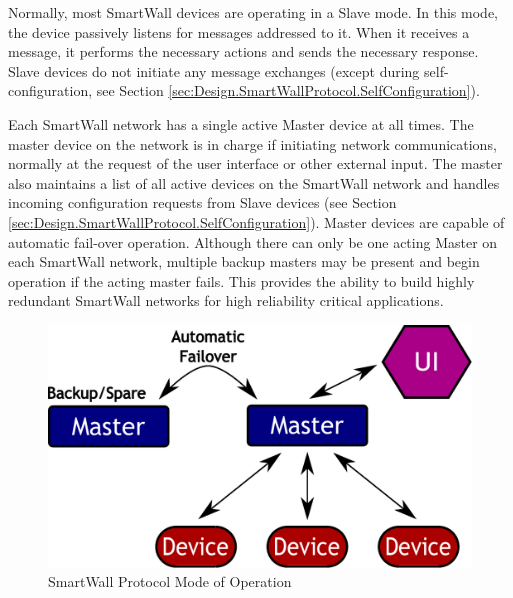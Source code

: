 \documentclass[12pt]{article}
\begin{document}
Normally, most SmartWall devices are operating in a
Slave mode. In this mode, the device passively listens for messages
addressed to it. When it receives a message, it performs the necessary
actions and sends the necessary response. Slave devices do not initiate
any message exchanges (except during self-configuration, see Section
\ref{sec:Design.SmartWallProtocol.SelfConfiguration}).

Each SmartWall network has a single active Master device at all
times. The master device on the network is in charge if initiating network
communications, normally at the request of the user interface or other
external input. The master also maintains a list of all active devices
on the SmartWall network and handles incoming configuration requests
from Slave devices (see Section
\ref{sec:Design.SmartWallProtocol.SelfConfiguration}). Master devices
are capable of automatic fail-over operation. Although there can only
be one acting Master on each SmartWall network, multiple backup masters
may be present and begin operation if the acting master fails. This
provides the ability to build highly redundant SmartWall networks for
high reliability critical applications.

\begin{figure}
  \begin{center}
    \includegraphics[scale=.5]{networkmode.pdf}
  \end{center}
  \caption{SmartWall Protocol Mode of Operation}
  \label{fig:swMode}
\end{figure}
\end{document}
